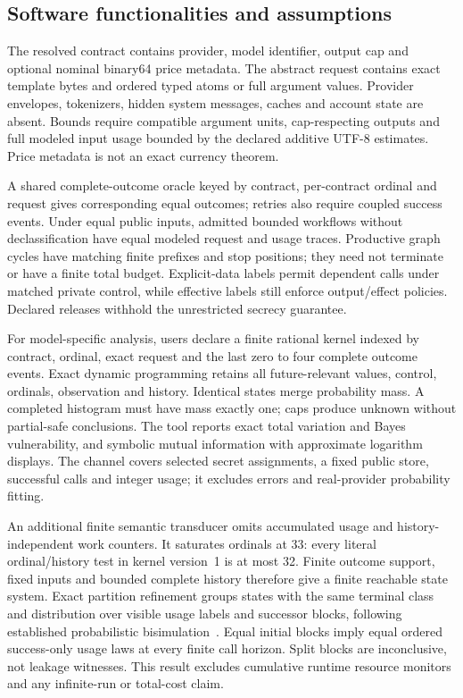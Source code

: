 \documentclass[preprint,12pt, a4paper]{elsarticle}
\begin{document}
\subsection{Software functionalities and assumptions}
The resolved contract contains provider, model identifier, output cap and optional nominal binary64 price metadata. The abstract request contains exact template bytes and ordered typed atoms or full argument values. Provider envelopes, tokenizers, hidden system messages, caches and account state are absent. Bounds require compatible argument units, cap-respecting outputs and full modeled input usage bounded by the declared additive UTF-8 estimates. Price metadata is not an exact currency theorem.

A shared complete-outcome oracle keyed by contract, per-contract ordinal and request gives corresponding equal outcomes; retries also require coupled success events. Under equal public inputs, admitted bounded workflows without declassification have equal modeled request and usage traces. Productive graph cycles have matching finite prefixes and stop positions; they need not terminate or have a finite total budget. Explicit-data labels permit dependent calls under matched private control, while effective labels still enforce output/effect policies. Declared releases withhold the unrestricted secrecy guarantee.

For model-specific analysis, users declare a finite rational kernel indexed by contract, ordinal, exact request and the last zero to four complete outcome events. Exact dynamic programming retains all future-relevant values, control, ordinals, observation and history. Identical states merge probability mass. A completed histogram must have mass exactly one; caps produce unknown without partial-safe conclusions. The tool reports exact total variation and Bayes vulnerability, and symbolic mutual information with approximate logarithm displays. The channel covers selected secret assignments, a fixed public store, successful calls and integer usage; it excludes errors and real-provider probability fitting.

An additional finite semantic transducer omits accumulated usage and history-independent work counters. It saturates ordinals at 33: every literal ordinal/history test in kernel version~1 is at most 32. Finite outcome support, fixed inputs and bounded complete history therefore give a finite reachable state system. Exact partition refinement groups states with the same terminal class and distribution over visible usage labels and successor blocks, following established probabilistic bisimulation~\cite{bisim}. Equal initial blocks imply equal ordered success-only usage laws at every finite call horizon. Split blocks are inconclusive, not leakage witnesses. This result excludes cumulative runtime resource monitors and any infinite-run or total-cost claim.
\end{document}
